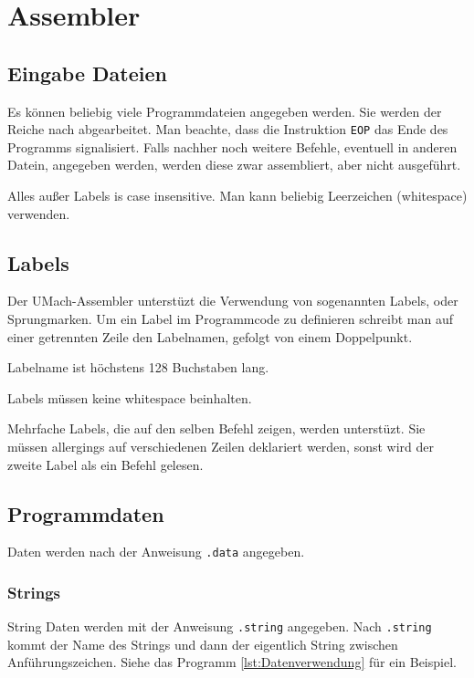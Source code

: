 \section{Assembler}

\subsection{Eingabe Dateien}

Es können beliebig viele Programmdateien angegeben werden. Sie werden der
Reiche nach abgearbeitet. Man beachte, dass die Instruktion \texttt{EOP} das
Ende des Programms signalisiert. Falls nachher noch weitere Befehle, eventuell
in anderen Datein, angegeben werden, werden diese zwar assembliert, aber nicht
ausgeführt.

Alles außer Labels is case insensitive. Man kann beliebig Leerzeichen
(whitespace) verwenden.

\subsection{Labels}

Der UMach-Assembler unterstüzt die Verwendung von sogenannten \glqq
Labels\grqq, oder Sprungmarken. Um ein Label im Programmcode zu definieren
schreibt man auf einer getrennten Zeile den Labelnamen, gefolgt von einem
Doppelpunkt.

Labelname ist höchstens 128 Buchstaben lang.

Labels müssen keine whitespace beinhalten.

Mehrfache Labels, die auf den selben Befehl zeigen, werden unterstüzt. Sie
müssen allergings auf verschiedenen Zeilen deklariert werden, sonst wird der
zweite Label als ein Befehl gelesen.

\subsection{Programmdaten}

Daten werden nach der Anweisung \texttt{.data} angegeben.

\subsubsection{Strings}

String Daten werden mit der Anweisung \texttt{.string} angegeben.
Nach \texttt{.string} kommt der Name des Strings und dann der eigentlich String
zwischen Anführungszeichen. Siehe das Programm \ref{lst:Datenverwendung} für
ein Beispiel.

